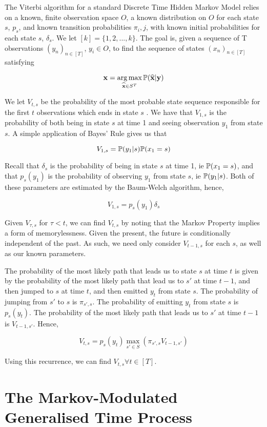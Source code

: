 The Viterbi algorithm for a standard Discrete Time Hidden Markov Model relies on a known, finite observation space $O$, a known distribution on $O$ for each state $s$, $p_s$, and known transition probabilities $\pi_i,j$, with known initial probabilities for each state $s$, $\delta_s$. We let $[k] = \{1,2,...,k\}$. The goal is, given a sequence of T observations $(y_n)_{n \in [T]}$, $y_i \in O$, to find the sequence of states $(x_n)_{n \in [T]}$ satisfying

$$
\mathbf{x} = \operatorname*{arg\,max}_{\widehat{\mathbf{x}} \in S^T} \mathbb{P}(\mathbf{\widehat{x}} | \mathbf{y})
$$

We let $V_{t,s}$ be the probability of the most probable state sequence responsible for the first $t$ observations which ends in state $s$ %
. We have that $V_{1,s}$ is the probability of both being in state $s$ at time 1 and seeing observation $y_1$ from state $s$. A simple application of Bayes' Rule gives us that

$$
V_{1,s} = \mathbb{P} (y_1|s)\mathbb{P}(x_1=s)
$$

Recall that $\delta_s$ is the probability of being in state $s$ at time 1, ie $\mathbb{P}(x_1=s)$, and that $p_s(y_1)$ is the probability of observing $y_1$ from state $s$, ie $\mathbb{P} (y_1|s)$. Both of these parameters are estimated by the Baum-Welch algorithm, hence,

$$
V_{1,s} = p_s(y_1)\delta_s
$$

Given $V_{\tau,s}$ for $\tau < t$, we can find $V_{t,s}$ by noting that the Markov Property implies a form of memorylessness. Given the present, the future is conditionally independent of the past. As such, we need only consider $V_{t-1,s}$ for each $s$, as well as our known parameters. 

The probability of the most likely path that leads us to state $s$ at time $t$ is given by the probability of the most likely path that lead us to $s'$ at time $t-1$, and then jumped to $s$ at time $t$, and then emitted $y_t$ from state $s$. The probability of jumping from $s'$ to $s$ is $\pi_{s',s}$. The probability of emitting $y_t$ from state $s$ is $p_s(y_t)$. The probability of the most likely path that leads us to $s'$ at time $t-1$ is $V_{t-1,s'}$. Hence,

$$
V_{t,s} = p_s(y_t) \max_{s'\in S} (\pi_{s',s}V_{t-1,s'})
$$

Using this recurrence, we can find $V_{t,s} \forall t \in [T]$. 

\section{The Markov-Modulated Generalised Time Process}